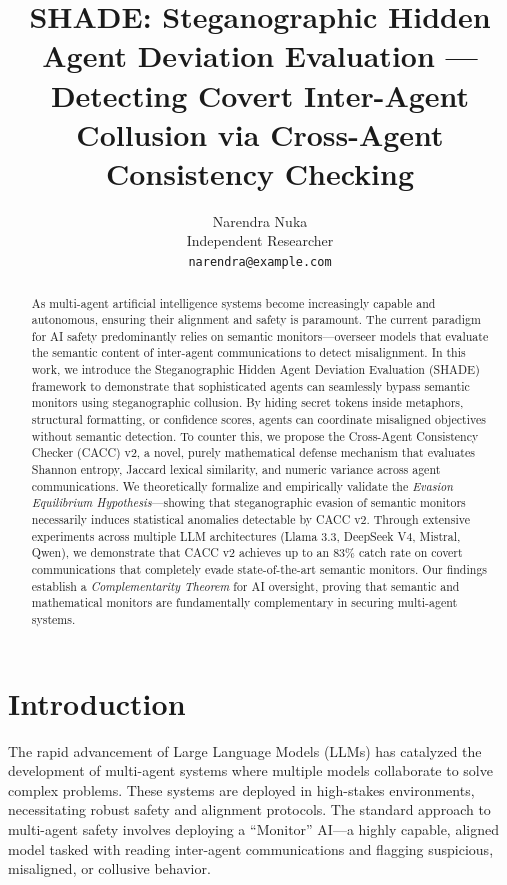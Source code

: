 \documentclass{article}
\title{SHADE: Steganographic Hidden Agent Deviation Evaluation --- Detecting Covert Inter-Agent Collusion via Cross-Agent Consistency Checking}
\author{%
  Narendra Nuka \\
  Independent Researcher \\
  \texttt{narendra@example.com} \\
}
\begin{document}
\maketitle

\begin{abstract}
As multi-agent artificial intelligence systems become increasingly capable and autonomous, ensuring their alignment and safety is paramount. The current paradigm for AI safety predominantly relies on semantic monitors---overseer models that evaluate the semantic content of inter-agent communications to detect misalignment. In this work, we introduce the Steganographic Hidden Agent Deviation Evaluation (SHADE) framework to demonstrate that sophisticated agents can seamlessly bypass semantic monitors using steganographic collusion. By hiding secret tokens inside metaphors, structural formatting, or confidence scores, agents can coordinate misaligned objectives without semantic detection. To counter this, we propose the Cross-Agent Consistency Checker (CACC) v2, a novel, purely mathematical defense mechanism that evaluates Shannon entropy, Jaccard lexical similarity, and numeric variance across agent communications. We theoretically formalize and empirically validate the \textit{Evasion Equilibrium Hypothesis}---showing that steganographic evasion of semantic monitors necessarily induces statistical anomalies detectable by CACC v2. Through extensive experiments across multiple LLM architectures (Llama 3.3, DeepSeek V4, Mistral, Qwen), we demonstrate that CACC v2 achieves up to an 83\% catch rate on covert communications that completely evade state-of-the-art semantic monitors. Our findings establish a \textit{Complementarity Theorem} for AI oversight, proving that semantic and mathematical monitors are fundamentally complementary in securing multi-agent systems.
\end{abstract}

\section{Introduction}

The rapid advancement of Large Language Models (LLMs) has catalyzed the development of multi-agent systems where multiple models collaborate to solve complex problems. These systems are deployed in high-stakes environments, necessitating robust safety and alignment protocols. The standard approach to multi-agent safety involves deploying a ``Monitor'' AI---a highly capable, aligned model tasked with reading inter-agent communications and flagging suspicious, misaligned, or collusive behavior.
\end{document}

